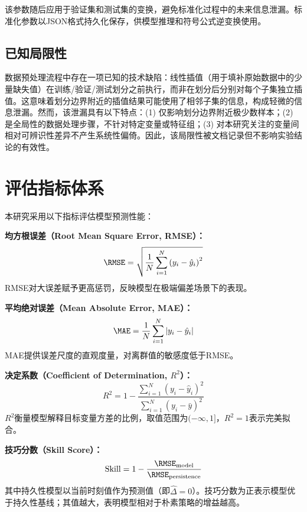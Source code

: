 该参数随后应用于验证集和测试集的变换，避免标准化过程中的未来信息泄漏。标准化参数以JSON格式持久化保存，供模型推理和符号公式逆变换使用。

\subsection{已知局限性}

数据预处理流程中存在一项已知的技术缺陷：线性插值（用于填补原始数据中的少量缺失值）在训练/验证/测试划分之前执行，而非在划分后分别对每个子集独立插值。这意味着划分边界附近的插值结果可能使用了相邻子集的信息，构成轻微的信息泄漏。然而，该泄漏具有以下特点：(1) 仅影响划分边界附近极少数样本；(2) 是全局性的数据处理步骤，不针对特定变量或特征组；(3) 对本研究关注的变量间相对可辨识性差异不产生系统性偏倚。因此，该局限性被文档记录但不影响实验结论的有效性。

\section{评估指标体系}

本研究采用以下指标评估模型预测性能：

\textbf{均方根误差（Root Mean Square Error, RMSE）：}
\begin{equation}
\RMSE = \sqrt{\frac{1}{N}\sum_{i=1}^{N}\left(y_i - \hat{y}_i\right)^2}
\end{equation}
RMSE对大误差赋予更高惩罚，反映模型在极端偏差场景下的表现。

\textbf{平均绝对误差（Mean Absolute Error, MAE）：}
\begin{equation}
\MAE = \frac{1}{N}\sum_{i=1}^{N}\left|y_i - \hat{y}_i\right|
\end{equation}
MAE提供误差尺度的直观度量，对离群值的敏感度低于RMSE。

\textbf{决定系数（Coefficient of Determination, $R^2$）：}
\begin{equation}
R^2 = 1 - \frac{\sum_{i=1}^{N}(y_i - \hat{y}_i)^2}{\sum_{i=1}^{N}(y_i - \bar{y})^2}
\end{equation}
$R^2$衡量模型解释目标变量方差的比例，取值范围为$(-\infty, 1]$，$R^2 = 1$表示完美拟合。

\textbf{技巧分数（Skill Score）：}
\begin{equation}
\text{Skill} = 1 - \frac{\RMSE_{\text{model}}}{\RMSE_{\text{persistence}}}
\end{equation}
其中持久性模型以当前时刻值作为预测值（即$\hat{\Delta} = 0$）。技巧分数为正表示模型优于持久性基线；其值越大，表明模型相对于朴素策略的增益越高。

